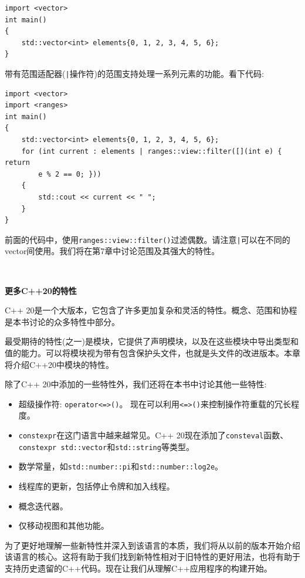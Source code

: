\begin{lstlisting}[caption={}]
import <vector>
int main()
{
	std::vector<int> elements{0, 1, 2, 3, 4, 5, 6};
}
\end{lstlisting}

带有范围适配器(\texttt{|}操作符)的范围支持处理一系列元素的功能。看下代码: \par

\begin{lstlisting}[caption={}]
import <vector>
import <ranges>
int main()
{
	std::vector<int> elements{0, 1, 2, 3, 4, 5, 6};
	for (int current : elements | ranges::view::filter([](int e) { return
		e % 2 == 0; }))
	{
		std::cout << current << " ";
	}
}
\end{lstlisting}

前面的代码中，使用\texttt{ranges::view::filter()}过滤偶数。请注意\texttt{|}可以在不同的vector间使用。我们将在第7章中讨论范围及其强大的特性。 \par

\noindent\textbf{}\ \par
\textbf{更多C++20的特性}\ \par
C++ 20是一个大版本，它包含了许多更加复杂和灵活的特性。概念、范围和协程是本书讨论的众多特性中部分。 \par
最受期待的特性(之一)是模块，它提供了声明模块，以及在这些模块中导出类型和值的能力。可以将模块视为带有包含保护头文件，也就是头文件的改进版本。本章将介绍C++20中模块的特性。 \par
除了C++ 20中添加的一些特性外，我们还将在本书中讨论其他一些特性: \par

\begin{itemize}
	\item 超级操作符: \texttt{operator<=>()}。 现在可以利用\texttt{<=>()}来控制操作符重载的冗长程度。
	\item \texttt{constexpr}在这门语言中越来越常见。C++ 20现在添加了\texttt{consteval}函数、\texttt{constexpr std::vector}和\texttt{std::string}等类型。
	\item 数学常量，如\texttt{std::number::pi}和\texttt{std::number::log2e}。
	\item 线程库的更新，包括停止令牌和加入线程。
	\item 概念迭代器。
	\item 仅移动视图和其他功能。
\end{itemize}

为了更好地理解一些新特性并深入到该语言的本质，我们将从以前的版本开始介绍该语言的核心。这将有助于我们找到新特性相对于旧特性的更好用法，也将有助于支持历史遗留的C++代码。现在让我们从理解C++应用程序的构建开始。 \par

